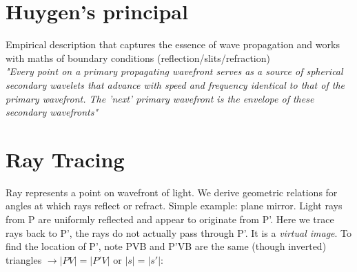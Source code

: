 \documentclass[a4paper, 11pt, normalem]{report}
\begin{document}
\section{Huygen's principal}
Empirical description that captures the essence of wave propagation and works with maths of boundary conditions (reflection/slits/refraction) \\
\emph{"Every point on a primary propagating wavefront serves as a source of spherical secondary wavelets that advance with speed and frequency identical to that of the primary wavefront. The 'next' primary wavefront is the envelope of these secondary wavefronts"}

\section{Ray Tracing}
Ray represents a point on wavefront of light.
We derive geometric relations for angles at which rays reflect or refract.
Simple example: plane mirror.
Light rays from P are uniformly reflected and appear to originate from P'.
Here we trace rays back to P', the rays do not actually pass through P'.
It is a \emph{virtual image}.
To find the location of P', note PVB and P'VB are the same (though inverted) triangles $\rightarrow |PV| = |P'V|$ or $|s| = |s'|$:
\end{document}
